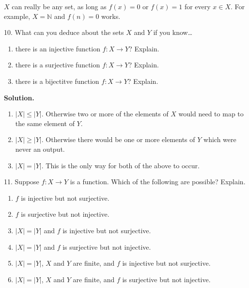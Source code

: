 \documentclass[10pt,]{book}
\theoremstyle{plain}
\theoremstyle{definition}
\theoremstyle{definition}
\theoremstyle{definition}
\numberwithin{equation}{section}
\def\N{\mathbb N}
\begin{document}
\begin{exerciselist}
\(X\) can really be any set, as long as \(f(x) = 0\) or \(f(x) = 1\) for every \(x \in X\). For example, \(X = \N\) and \(f(n) = 0\) works.
%
\item[10.]\hypertarget{exercise-36}{}
What can you deduce about the sets \(X\) and \(Y\) if you know\dots{}
%
\leavevmode%
\begin{enumerate}[label=(\alph*)]
\item\hypertarget{li-339}{}
there is an injective function \(f:X \to Y\)?  Explain.
%
\item\hypertarget{li-340}{}
there is a surjective function \(f:X \to Y\)?  Explain.
%
\item\hypertarget{li-341}{}
there is a bijectitve function \(f:X \to Y\)?  Explain.
%
\end{enumerate}
\par\smallskip
\par\smallskip
\noindent\textbf{Solution.}\hypertarget{solution-54}{}\quad
\leavevmode%
\begin{enumerate}[label=(\alph*)]
\item\hypertarget{li-342}{}\(|X| \le |Y|\). Otherwise two or more of the elements of \(X\) would need to map to the same element of \(Y\).\item\hypertarget{li-343}{}\(|X| \ge |Y|\). Otherwise there would be one or more elements of \(Y\) which were never an output.\item\hypertarget{li-344}{}\(|X| = |Y|\).  This is the only way for both of the above to occur.\end{enumerate}
\item[11.]\hypertarget{exercise-37}{}
Suppose \(f:X \to Y\) is a function. Which of the following are possible? Explain.
%
\leavevmode%
\begin{enumerate}[label=(\alph*)]
\item\hypertarget{li-345}{}\(f\) is injective but not surjective.\item\hypertarget{li-346}{}\(f\) is surjective but not injective.\item\hypertarget{li-347}{}\(|X| = |Y|\) and \(f\) is injective but not surjective.\item\hypertarget{li-348}{}\(|X| = |Y|\) and \(f\) is surjective but not injective.\item\hypertarget{li-349}{}\(|X| = |Y|\), \(X\) and \(Y\) are finite, and \(f\) is injective but not surjective.\item\hypertarget{li-350}{}\(|X| = |Y|\), \(X\) and \(Y\) are finite, and \(f\) is surjective but not injective.\end{enumerate}

\end{exerciselist}
\end{document}
